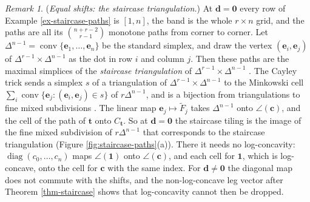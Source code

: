 \documentclass[11pt, a4paper, abstract=yes]{scrartcl}
\theoremstyle{definition}
\theoremstyle{remark}
\newtheorem{remark}[definition]{Remark}
\theoremstyle{plain}
\newcommand{\vek}[1]{\boldsymbol{#1}}
\theoremstyle{remark}
\theoremstyle{plain}
\newcommand{\conv}{\operatorname{conv}}
\newcommand{\rasimp}{\angle}
\begin{document}
\begin{remark}
(\emph{Equal shifts: the staircase triangulation.}) At \(\vek d=\vek 0\) every row of
Example \ref{ex-staircase-paths} is \([1,n]\), the band is the whole \(r\times n\) grid, and the paths
are all its \(\binom{n+r-2}{r-1}\) monotone paths from corner to corner. Let
\(\Delta^{n-1}=\conv\lbrace\vek e_1,\dots,\vek e_n\rbrace\) be the standard simplex, and draw the
vertex \((\vek e_i,\vek e_j)\) of \(\Delta^{r-1}\times\Delta^{n-1}\) as the dot in row \(i\) and
column \(j\). Then these paths are the maximal simplices of the \emph{staircase triangulation} of
\(\Delta^{r-1}\times\Delta^{n-1}\) \autocite[Example 2.2]{CeballosPadrolSarmiento2015}. The Cayley
trick sends a simplex \(s\) of a triangulation of \(\Delta^{r-1}\times\Delta^{n-1}\) to the
Minkowski cell \(\sum_i\conv\lbrace\vek e_j:(\vek e_i,\vek e_j)\in s\rbrace\) of \(r\Delta^{n-1}\),
and is a bijection from triangulations to fine mixed subdivisions \autocites[Theorem 1.4 and
Section 1.4]{Santos2005}[Section 2]{CeballosPadrolSarmiento2015}. The linear map \(\vek e_j\mapsto\tilde F_j\)
takes \(\Delta^{n-1}\) onto \(\rasimp(\vek c)\), and the cell of the path of \(\vek t\) onto
\(C_{\vek t}\). So at \(\vek d=\vek 0\) the staircase tiling is the image of the fine mixed
subdivision of \(r\Delta^{n-1}\) that corresponds to the staircase triangulation
(Figure \ref{fig:staircase-paths}(a)). There it needs no log-concavity:
\(\operatorname{diag}(c_0,\dots,c_n)\) maps \(\rasimp(\vek 1)\) onto \(\rasimp(\vek c)\), and each
cell for \(\vek 1\), which is log-concave, onto the cell for \(\vek c\) with the same index. For
\(\vek d\ne\vek 0\) the diagonal map does not commute with the shifts, and the non-log-concave
leg vector after Theorem \ref{thm-staircase} shows that log-concavity cannot then be dropped.
\label{rem-staircase-cayley}
\end{remark}
\end{document}
